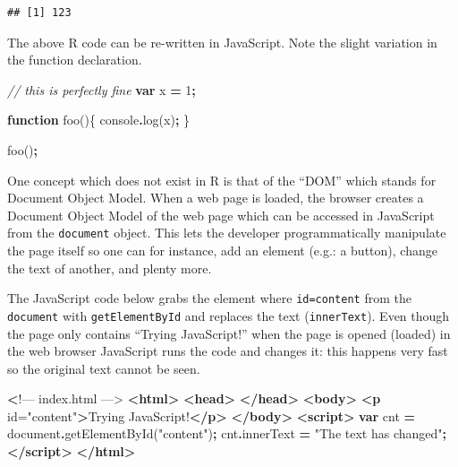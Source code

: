\documentclass[
]{krantz}
\makeatletter
\newenvironment{Shaded}{\begin{snugshade}}{\end{snugshade}}
\newcommand{\AttributeTok}[1]{\textcolor[rgb]{0.61,0.61,0.61}{#1}}
\newcommand{\BuiltInTok}[1]{#1}
\newcommand{\CommentTok}[1]{\textcolor[rgb]{0.37,0.37,0.37}{\textit{#1}}}
\newcommand{\DecValTok}[1]{\textcolor[rgb]{0.06,0.06,0.06}{#1}}
\newcommand{\ErrorTok}[1]{\textcolor[rgb]{0.14,0.14,0.14}{\textbf{#1}}}
\newcommand{\FunctionTok}[1]{\textcolor[rgb]{0,0,0}{#1}}
\newcommand{\KeywordTok}[1]{\textcolor[rgb]{0.27,0.27,0.27}{\textbf{#1}}}
\newcommand{\NormalTok}[1]{#1}
\newcommand{\OperatorTok}[1]{\textcolor[rgb]{0.43,0.43,0.43}{\textbf{#1}}}
\newcommand{\OtherTok}[1]{\textcolor[rgb]{0.37,0.37,0.37}{#1}}
\newcommand{\StringTok}[1]{\textcolor[rgb]{0.5,0.5,0.5}{#1}}
\newenvironment{kframe}{%
\medskip{}
\setlength{\fboxsep}{.8em}
 \def\at@end@of@kframe{}%
 \ifinner\ifhmode%
  \def\at@end@of@kframe{\end{minipage}}%
  \begin{minipage}{\columnwidth}%
 \fi\fi%
 \def\FrameCommand##1{\hskip\@totalleftmargin \hskip-\fboxsep
 \colorbox{shadecolor}{##1}\hskip-\fboxsep
     \hskip-\linewidth \hskip-\@totalleftmargin \hskip\columnwidth}%
 \MakeFramed {\advance\hsize-\width
   \@totalleftmargin\z@ \linewidth\hsize
   \@setminipage}}%
 {\par\unskip\endMakeFramed%
 \at@end@of@kframe}
\renewenvironment{Shaded}{\begin{kframe}}{\end{kframe}}
\makeatother
\begin{document}
\begin{verbatim}
## [1] 123
\end{verbatim}

The above R code can be re-written in JavaScript. Note the slight variation in the function declaration.

\begin{Shaded}
\begin{Highlighting}[]
\CommentTok{// this is perfectly fine}
\KeywordTok{var}\NormalTok{ x }\OperatorTok{=} \DecValTok{1}\OperatorTok{;}

\KeywordTok{function} \FunctionTok{foo}\NormalTok{()\{}
  \BuiltInTok{console}\OperatorTok{.}\FunctionTok{log}\NormalTok{(x)}\OperatorTok{;} 
\NormalTok{\}}

\NormalTok{foo()}\OperatorTok{;}
\end{Highlighting}
\end{Shaded}

One concept which does not exist in R is that of the ``DOM'' which stands for Document Object Model. When a web page is loaded, the browser creates a Document Object Model of the web page which can be accessed in JavaScript from the \texttt{document} object. This lets the developer programmatically manipulate the page itself so one can for instance, add an element (e.g.: a button), change the text of another, and plenty more.

The JavaScript code below grabs the element where \texttt{id=\textquotesingle{}content\textquotesingle{}} from the \texttt{document} with \texttt{getElementById} and replaces the text (\texttt{innerText}). Even though the page only contains ``Trying JavaScript!'' when the page is opened (loaded) in the web browser JavaScript runs the code and changes it: this happens very fast so the original text cannot be seen.

\begin{Shaded}
\begin{Highlighting}[]
 \ErrorTok{\textless{}}\NormalTok{!–– index.html ––\textgreater{}}
\KeywordTok{\textless{}html\textgreater{}}
  \KeywordTok{\textless{}head\textgreater{}}
  \KeywordTok{\textless{}/head\textgreater{}}
  \KeywordTok{\textless{}body\textgreater{}}
    \KeywordTok{\textless{}p}\OtherTok{ id=}\StringTok{"content"}\KeywordTok{\textgreater{}}\NormalTok{Trying JavaScript!}\KeywordTok{\textless{}/p\textgreater{}}
  \KeywordTok{\textless{}/body\textgreater{}}
  \KeywordTok{\textless{}script\textgreater{}}
    \KeywordTok{var}\NormalTok{ cnt }\OperatorTok{=} \BuiltInTok{document}\OperatorTok{.}\FunctionTok{getElementById}\NormalTok{(}\StringTok{"content"}\NormalTok{)}\OperatorTok{;}
\NormalTok{    cnt}\OperatorTok{.}\AttributeTok{innerText} \OperatorTok{=} \StringTok{"The text has changed"}\OperatorTok{;}
  \KeywordTok{\textless{}/script\textgreater{}}
\KeywordTok{\textless{}/html\textgreater{}}
\end{Highlighting}
\end{Shaded}
\end{document}
